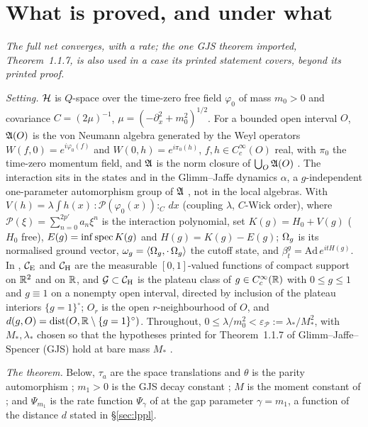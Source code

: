 \section{What is proved, and under what}\label{sec:result}

\emph{The full net converges, with a rate; the one GJS theorem imported, Theorem~1.1.7, is
also used in a case its printed statement covers, beyond its printed proof.}

\emph{Setting.}
$\mathcal{H}$ is $Q$-space over the time-zero free field $\varphi_0$ of mass $m_0>0$ and covariance
$C=(2\mu)^{-1}$, $\mu=(-\partial_x^2+m_0^2)^{1/2}$. For a bounded
open interval $O$, $\mathfrak{A}(O)$ is the von Neumann algebra generated by the Weyl operators
$W(f,0)=e^{i\varphi_0(f)}$ and $W(0,h)=e^{i\pi_0(h)}$, $f,h\in C_c^\infty(O)$ real, with
$\pi_0$ the time-zero momentum field, and
$\mathfrak{A}$ is the norm closure of $\bigcup_O\mathfrak{A}(O)$
. The interaction sits in the states and in the Glimm--Jaffe dynamics
$\alpha$, a $g$-independent one-parameter automorphism group of $\mathfrak{A}$ ,
not in the local algebras. With
$V(h)=\lambda\int h(x)\,{:}\mathscr P(\varphi_0(x)){:}_C\,dx$ (coupling $\lambda$,
$C$-Wick order), where $\mathscr P(\xi)=\sum_{n=0}^{2p'}a_n\xi^n$ is the interaction
polynomial, set
$K(g)=H_0+V(g)$ ($H_0$ free), $E(g)=\inf\operatorname{spec} K(g)$ and $H(g)=K(g)-E(g)$;
$\Omega_g$ is its normalised ground vector, $\omega_g=\langle \Omega_g,\cdot\,\Omega_g\rangle$ the cutoff
state, and $\beta^g_t=\mathrm{Ad}\,e^{itH(g)}$. In , $\mathcal{C}_{\mathrm E}$
and $\mathcal{C}_{\mathrm H}$ are the measurable $[0,1]$-valued functions of compact support on $\mathbb{R}^2$ and on
$\mathbb{R}$, and $\mathcal{G}\subset\mathcal{C}_{\mathrm H}$ is the plateau class of $g\in C_c^\infty(\mathbb{R})$ with $0\le g\le1$
and $g\equiv1$ on a nonempty open interval, directed by inclusion of the plateau interiors
$\{g=1\}^\circ$; $O_r$ is the open $r$-neighbourhood of $O$, and
$d(g,O)=\operatorname{dist}(O,\mathbb{R}\setminus\{g=1\}^\circ)$. Throughout,
$0\le\lambda/m_0^2<\varepsilon_{\mathscr P}:=\lambda_*/M_*^2$, with $M_*,\lambda_*$
chosen so that the hypotheses printed for Theorem~1.1.7 of Glimm--Jaffe--Spencer (GJS)
\cite{GJS} hold at bare mass $M_*$ .

\emph{The theorem.}
Below, $\tau_a$ are the space translations and $\theta$ is the parity automorphism
; $m_1>0$ is the GJS decay constant ; $M$ is the moment
constant of ; and $\Psi_{m_1}$ is the rate function $\Psi_\gamma$ of
 at the gap parameter $\gamma=m_1$, a function of the distance $d$ stated in
\S\ref{sec:lppl}.

